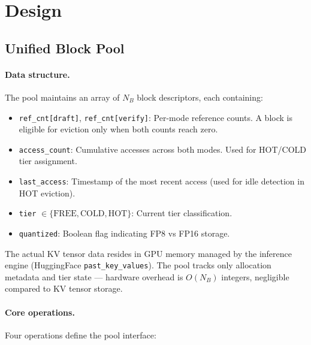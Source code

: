 \documentclass[review]{elsarticle}
\theoremstyle{definition}
\theoremstyle{remark}
\begin{document}
\section{Design}

\subsection{Unified Block Pool}

\paragraph{Data structure.}
The pool maintains an array of $N_B$ block descriptors, each containing:

\begin{itemize}
    \item \texttt{ref\_cnt[draft]}, \texttt{ref\_cnt[verify]}: Per-mode
    reference counts. A block is eligible for eviction only when both
    counts reach zero.
    \item \texttt{access\_count}: Cumulative accesses across both modes.
    Used for HOT/COLD tier assignment.
    \item \texttt{last\_access}: Timestamp of the most recent access
    (used for idle detection in HOT eviction).
    \item \texttt{tier} $\in \{\text{FREE}, \text{COLD}, \text{HOT}\}$:
    Current tier classification.
    \item \texttt{quantized}: Boolean flag indicating FP8 vs FP16 storage.
\end{itemize}

The actual KV tensor data resides in GPU memory managed by the inference
engine (HuggingFace \texttt{past\_key\_values}). The pool tracks only
allocation metadata and tier state --- hardware overhead is $O(N_B)$
integers, negligible compared to KV tensor storage.

\paragraph{Core operations.}
Four operations define the pool interface:
\end{document}
